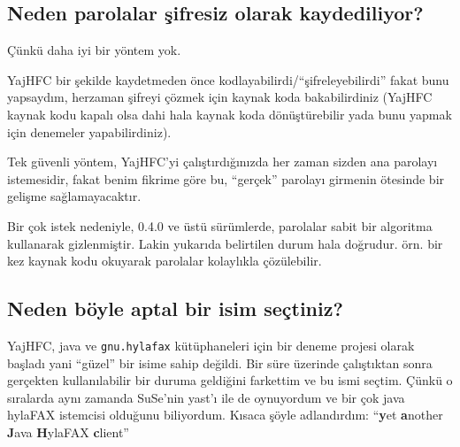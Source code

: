 \documentclass[a4paper,10pt]{scrartcl}
\begin{document}
\subsection{Neden parolalar şifresiz olarak kaydediliyor?}

Çünkü daha iyi bir yöntem yok.

YajHFC bir şekilde kaydetmeden önce kodlayabilirdi/``şifreleyebilirdi'' fakat
bunu yapsaydım, herzaman şifreyi çözmek için kaynak koda bakabilirdiniz 
(YajHFC kaynak kodu kapalı olsa dahi hala kaynak koda dönüştürebilir 
yada bunu yapmak için denemeler yapabilirdiniz).

Tek güvenli yöntem, YajHFC'yi çalıştırdığınızda her zaman sizden ana parolayı 
istemesidir, fakat benim fikrime göre bu, ``gerçek'' parolayı girmenin ötesinde
bir gelişme sağlamayacaktır.

Bir çok istek nedeniyle, 0.4.0 ve üstü sürümlerde, parolalar sabit bir algoritma kullanarak gizlenmiştir.
Lakin yukarıda belirtilen durum hala doğrudur. örn. bir kez kaynak kodu okuyarak parolalar kolaylıkla çözülebilir.

\subsection{Neden böyle aptal bir isim seçtiniz?}

YajHFC, java ve \texttt{gnu.hylafax} kütüphaneleri için bir deneme projesi olarak başladı
yani ``güzel'' bir isime sahip değildi. Bir süre üzerinde çalıştıktan sonra 
gerçekten kullanılabilir bir duruma geldiğini farkettim ve bu ismi seçtim. 
Çünkü o sıralarda aynı zamanda SuSe'nin yast'ı ile de oynuyordum ve bir çok java hylaFAX istemcisi 
olduğunu biliyordum. Kısaca şöyle adlandırdım:
``\textbf{y}et \textbf{a}nother \textbf{J}ava \textbf{H}ylaFAX \textbf{c}lient''
\end{document}
